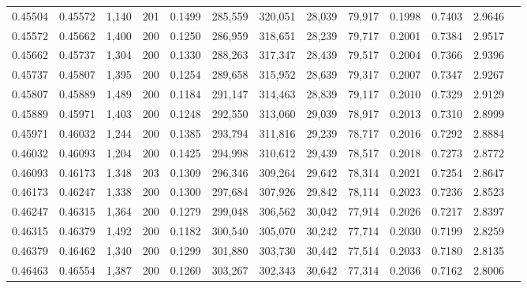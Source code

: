 \begin{tabular}{rrrrrrrrrrrrr}
0.45504 & 0.45572 & 1,140 & 201 &                                     0.1499 & 285,559 & 320,051 &  28,039 &  79,917 & 0.1998 & 0.7403 & 2.9646 \\
0.45572 & 0.45662 & 1,400 & 200 &                                     0.1250 & 286,959 & 318,651 &  28,239 &  79,717 & 0.2001 & 0.7384 & 2.9517 \\
0.45662 & 0.45737 & 1,304 & 200 &                                     0.1330 & 288,263 & 317,347 &  28,439 &  79,517 & 0.2004 & 0.7366 & 2.9396 \\
0.45737 & 0.45807 & 1,395 & 200 &                                     0.1254 & 289,658 & 315,952 &  28,639 &  79,317 & 0.2007 & 0.7347 & 2.9267 \\
0.45807 & 0.45889 & 1,489 & 200 &                                     0.1184 & 291,147 & 314,463 &  28,839 &  79,117 & 0.2010 & 0.7329 & 2.9129 \\
0.45889 & 0.45971 & 1,403 & 200 &                                     0.1248 & 292,550 & 313,060 &  29,039 &  78,917 & 0.2013 & 0.7310 & 2.8999 \\
0.45971 & 0.46032 & 1,244 & 200 &                                     0.1385 & 293,794 & 311,816 &  29,239 &  78,717 & 0.2016 & 0.7292 & 2.8884 \\
0.46032 & 0.46093 & 1,204 & 200 &                                     0.1425 & 294,998 & 310,612 &  29,439 &  78,517 & 0.2018 & 0.7273 & 2.8772 \\
0.46093 & 0.46173 & 1,348 & 203 &                                     0.1309 & 296,346 & 309,264 &  29,642 &  78,314 & 0.2021 & 0.7254 & 2.8647 \\
0.46173 & 0.46247 & 1,338 & 200 &                                     0.1300 & 297,684 & 307,926 &  29,842 &  78,114 & 0.2023 & 0.7236 & 2.8523 \\
0.46247 & 0.46315 & 1,364 & 200 &                                     0.1279 & 299,048 & 306,562 &  30,042 &  77,914 & 0.2026 & 0.7217 & 2.8397 \\
0.46315 & 0.46379 & 1,492 & 200 &                                     0.1182 & 300,540 & 305,070 &  30,242 &  77,714 & 0.2030 & 0.7199 & 2.8259 \\
0.46379 & 0.46462 & 1,340 & 200 &                                     0.1299 & 301,880 & 303,730 &  30,442 &  77,514 & 0.2033 & 0.7180 & 2.8135 \\
0.46463 & 0.46554 & 1,387 & 200 &                                     0.1260 & 303,267 & 302,343 &  30,642 &  77,314 & 0.2036 & 0.7162 & 2.8006 \\

\end{tabular}
